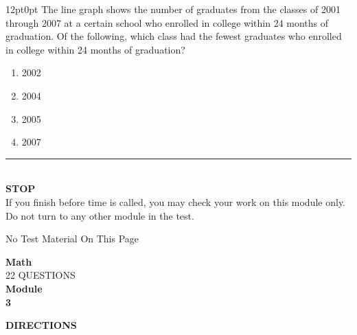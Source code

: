\documentclass[11pt, twocolumn]{article}
\newcommand{\currentmodulename}{}
\newcommand{\setmodulename}[1]{\renewcommand{\currentmodulename}{#1}}
\newcounter{questionnum}
\begin{document}
\vspace{6pt}\noindent
\begin{minipage}{\columnwidth}\raggedright
\noindent{}\par\vspace{8pt}
\begin{adjustwidth}{12pt}{0pt}
The line graph shows the number of graduates from the classes of 2001 through 2007 at a certain school who enrolled in college within 24 months of graduation. Of the following, which class had the fewest graduates who enrolled in college within 24 months of graduation?
\begin{enumerate}[label=\Alph*),leftmargin=18pt,topsep=3pt,itemsep=2pt]
  \item 2002
  \item 2004
  \item 2005
  \item 2007
\end{enumerate}
\end{adjustwidth}
\end{minipage}\par
\onecolumn
\thispagestyle{plainpage}
\vfill
\begin{center}
\rule{0.8\textwidth}{0.5pt}\\[6pt]
{\large\textbf{STOP}}\\[4pt]
{\small If you finish before time is called, you may check your work on this module only.\\
Do not turn to any other module in the test.}
\end{center}
\onecolumn
\newpage
\thispagestyle{plainpage}
\begin{center}
\vspace*{3in}
{\large No Test Material On This Page}
\end{center}

\setmodulename{Hard}
\onecolumn
\newpage
\thispagestyle{plainpage}
\setcounter{questionnum}{0}
\begin{center}
{\Large\textbf{Math}}\\[6pt]
{\large 22 QUESTIONS}\\[4pt]
{\large\textbf{Module}}\\
{\Large\textbf{3}}
\end{center}
\vspace{8pt}
\textbf{DIRECTIONS}
\end{document}
